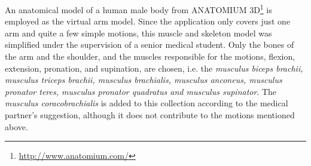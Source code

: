 An anatomical model of a human male body from ANATOMIUM 3D\footnote{\url{http://www.anatomium.com/}} is employed as the virtual arm model.
Since the application only covers just one arm and quite a few simple motions, this muscle and skeleton model was simplified under the supervision of a senior medical student. Only the bones of the arm and the shoulder, and the muscles responsible for the motions, flexion, extension, pronation, and supination, are chosen, i.e. the \textit{musculus biceps brachii, musculus triceps brachii, musculus brachialis, musculus anconeus, musculus pronator teres, musculus pronator quadratus and musculus supinator}. The \textit{musculus coracobrachialis} is added to this collection according to the medical partner's suggestion, although it does not contribute to the motions mentioned above.

